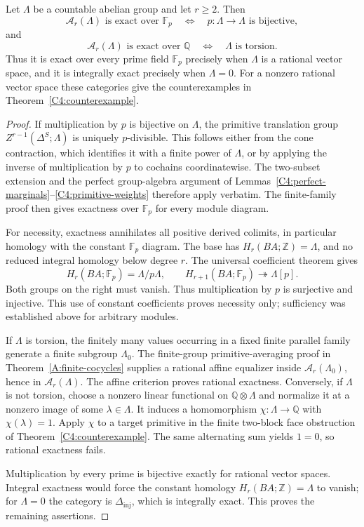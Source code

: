 \begin{corollary}
\label{C4:field-profile}
Let $\Lambda$ be a countable abelian group and let $r\geq2$. Then
\[
 \mathcal A_r(\Lambda)\text{ is exact over }\mathbb F_p
 \quad\Longleftrightarrow\quad
 p:\Lambda\longrightarrow\Lambda\text{ is bijective},
\]
and
\[
 \mathcal A_r(\Lambda)\text{ is exact over }\mathbb Q
 \quad\Longleftrightarrow\quad \Lambda\text{ is torsion}.
\]
Thus it is exact over every prime field $\mathbb F_p$ precisely when
$\Lambda$ is a rational vector space, and it is integrally exact
precisely when $\Lambda=0$. For a nonzero rational vector space these
categories give the counterexamples in Theorem~\ref{C4:counterexample}.
\end{corollary}
\begin{proof}
If multiplication by $p$ is bijective on $\Lambda$, the primitive
translation group
$Z^{r-1}(\Delta^S;\Lambda)$ is uniquely $p$-divisible. This follows
either from the cone contraction, which identifies it with a finite
power of $\Lambda$, or by applying the inverse of multiplication by
$p$ to cochains coordinatewise. The two-subset extension and the
perfect group-algebra argument of
Lemmas~\ref{C4:perfect-marginals}--\ref{C4:primitive-weights} therefore
apply verbatim. The finite-family proof then gives exactness over
$\mathbb F_p$ for every module diagram.

For necessity, exactness annihilates all positive derived colimits,
in particular homology with the constant $\mathbb F_p$ diagram.
The base has $H_r(BA;\mathbb Z)=\Lambda$, and no reduced integral
homology below degree $r$. The universal coefficient theorem gives
\[
 H_r(BA;\mathbb F_p)=\Lambda/p\Lambda,
 \qquad
 H_{r+1}(BA;\mathbb F_p)\twoheadrightarrow\Lambda[p].
\]
Both groups on the right must vanish. Thus multiplication by $p$ is
surjective and injective. This use of constant coefficients proves
necessity only; sufficiency was established above for arbitrary
modules.

If $\Lambda$ is torsion, the finitely many values occurring in a
fixed finite parallel family generate a finite subgroup
$\Lambda_0$. The finite-group primitive-averaging proof in
Theorem~\ref{A:finite-cocycles} supplies a rational affine equalizer
inside $\mathcal A_r(\Lambda_0)$, hence in $\mathcal A_r(\Lambda)$.
The affine criterion proves rational exactness. Conversely, if
$\Lambda$ is not torsion, choose a nonzero linear functional on
$\mathbb Q\otimes\Lambda$ and normalize it at a nonzero image of
some $\lambda\in\Lambda$. It induces a homomorphism
$\chi:\Lambda\to\mathbb Q$ with $\chi(\lambda)=1$.
Apply $\chi$ to a target primitive in the finite two-block face
obstruction of Theorem~\ref{C4:counterexample}. The same alternating
sum yields $1=0$, so rational exactness fails.

Multiplication by every prime is bijective exactly for rational
vector spaces. Integral exactness would force the constant homology
$H_r(BA;\mathbb Z)=\Lambda$ to vanish; for $\Lambda=0$ the category
is $\Delta_{\mathrm{inj}}$, which is integrally exact. This proves
the remaining assertions.
\end{proof}

